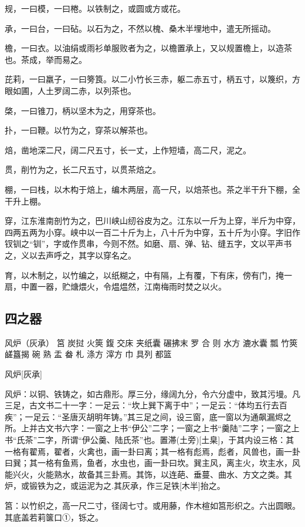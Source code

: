\documentclass[]{article}
\begin{document}
规，一曰模，一曰棬。以铁制之，或圆或方或花。

承，一曰台，一曰砧。以石为之，不然以槐、桑木半埋地中，遣无所摇动。

檐，一曰衣。以油绢或雨衫单服败者为之，以檐置承上，又以规置檐上，以造茶也。茶成，举而易之。

芘莉，一曰羸子，一曰篣筤。以二小竹长三赤，躯二赤五寸，柄五寸，以篾织，方眼如圃，人土罗阔二赤，以列茶也。

棨，一曰锥刀，柄以坚木为之，用穿茶也。

扑，一曰鞭。以竹为之，穿茶以解茶也。

焙，凿地深二尺，阔二尺五寸，长一丈，上作短墙，高二尺，泥之。

贯，削竹为之，长二尺五寸，以贯茶焙之。

棚，一曰栈，以木构于焙上，编木两层，高一尺，以焙茶也。茶之半干升下棚，全干升上棚。

穿，江东淮南剖竹为之，巴川峡山纫谷皮为之。江东以一斤为上穿，半斤为中穿，四两五两为小穿。峡中以一百二十斤为上，八十斤为中穿，五十斤为小穿。字旧作钗钏之``钏''，字或作贯串，今则不然。如磨、扇、弹、钻、缝五字，文以平声书之，义以去声呼之，其字以穿名之。

育，以木制之，以竹编之，以纸糊之，中有隔，上有覆，下有床，傍有门，掩一扇，中置一器，贮煻煨火，令煴煴然，江南梅雨时焚之以火。

\hypertarget{header-n25}{%
\subsection{四之器}\label{header-n25}}

风炉（灰承） 筥 炭挝 火筴 鍑 交床 夹纸囊 碾拂末 罗 合 则 水方 漉水囊 瓢
竹筴 鹾簋揭 碗 熟 盂 畚 札 涤方 滓方 巾 具列 都篮

风炉{[}灰承{]}

风炉：以铜、铁铸之，如古鼎形。厚三分，缘阔九分，令六分虚中，致其污墁。凡三足，古文书二十一字：一足云：``坎上巽下离于中''；一足云：``体均五行去百疾''；一足云：``圣唐灭胡明年铸。''其三足之间，设三窗，底一窗以为通飙漏烬之所。上并古文书六字：一窗之上书``伊公''二字；一窗之上书``羹陆''二字；一窗之上书``氏茶''二字，所谓``伊公羹、陆氏茶''也。置滞(土旁){[}土臬{]}，于其内设三格：其一格有翟焉，翟者，火禽也，画一卦曰离；其一格有彪焉，彪者，风兽也，画一卦曰巽；其一格有鱼焉，鱼者，水虫也，画一卦曰坎。巽主风，离主火，坎主水，风能兴火，火能熟水，故备其三卦焉。其饰，以连葩、垂蔓、曲水、方文之类。其炉，或锻铁为之，或运泥为之.其灰承，作三足铁{[}木半{]}抬之。

筥：以竹织之，高一尺二寸，径阔七寸。或用藤，作木楦如筥形织之。六出圆眼。其底盖若莉箧口①，铄之。
\end{document}
